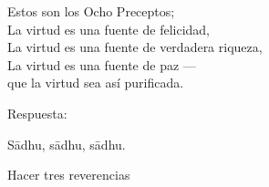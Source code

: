 \clearpage

\begin{english}
 Estos son los Ocho Preceptos;\\
 La virtud es una fuente de felicidad,\\
 La virtud es una fuente de verdadera riqueza,\\
 La virtud es una fuente de paz ---\\
 que la virtud sea así purificada.
\end{english}

\begin{instruction}
  Respuesta:
\end{instruction}

Sādhu, sādhu, sādhu.

\begin{instruction}
  Hacer tres reverencias
\end{instruction}

